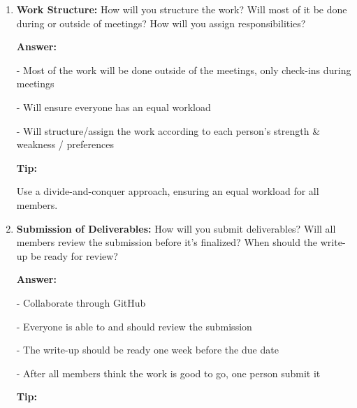 \documentclass[12pt]{article}
\newenvironment{answer}[1][]{
  \color{blue}\textbf{Answer:}
}{}
\newenvironment{alice}[1][]{
  \color{black}\textbf{Tip:}
}{}
\begin{document}
\begin{enumerate}
\begin{answer}
Contribution:

- Assign tasks equally for everyone

- Everyone should speak in the meeting

Making decisions:

- Majority vote held in the group chat

- Discuss consensus during meetings
\end{answer}

\begin{alice}

Structure meetings effectively and decide on a method for resolving disagreements, such as consensus or majority vote.
\end{alice}

\item {\bf Work Structure:} How will you structure the work? Will most of it be done during or outside of meetings? How will you assign responsibilities?

\begin{answer}

- Most of the work will be done outside of the meetings, only check-ins during meetings

- Will ensure everyone has an equal workload

- Will structure/assign the work according to each person's strength \& weakness / preferences
\end{answer}

\begin{alice}

Use a divide-and-conquer approach, ensuring an equal workload for all members.
\end{alice}

\item {\bf Submission of Deliverables:} How will you submit deliverables? Will all members review the submission before it's finalized? When should the write-up be ready for review?

\begin{answer}

- Collaborate through GitHub

- Everyone is able to and should review the submission

- The write-up should be ready one week before the due date

- After all members think the work is good to go, one person submit it
\end{answer}

\begin{alice}


\end{alice}
\end{enumerate}
\end{document}
